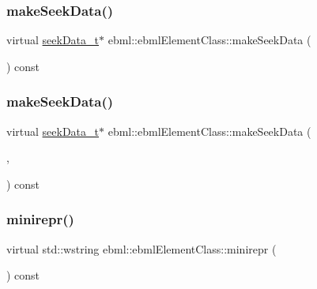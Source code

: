 \subsubsection{\texorpdfstring{make\+Seek\+Data()}{makeSeekData()}\hspace{0.1cm}{\footnotesize\ttfamily [1/2]}}
{\footnotesize\ttfamily virtual \mbox{\hyperlink{classebml_1_1seekData__t}{seek\+Data\+\_\+t}}$\ast$ ebml\+::ebml\+Element\+Class\+::make\+Seek\+Data (\begin{DoxyParamCaption}\item[{const \mbox{\hyperlink{classebml_1_1parseFile}{parse\+File}} \&}]{ }\end{DoxyParamCaption}) const\hspace{0.3cm}{\ttfamily [virtual]}}

\mbox{\label{classebml_1_1ebmlElementClass_ac844edef1226b728c127cdf946b3d152}} 
\subsubsection{\texorpdfstring{make\+Seek\+Data()}{makeSeekData()}\hspace{0.1cm}{\footnotesize\ttfamily [2/2]}}
{\footnotesize\ttfamily virtual \mbox{\hyperlink{classebml_1_1seekData__t}{seek\+Data\+\_\+t}}$\ast$ ebml\+::ebml\+Element\+Class\+::make\+Seek\+Data (\begin{DoxyParamCaption}\item[{const \mbox{\hyperlink{classebml_1_1parseFile}{parse\+File}} \&}]{,  }\item[{const \mbox{\hyperlink{namespaceebml_adad533b7705a16bb360fe56380c5e7be}{ebml\+Element\+\_\+sp}} \&}]{ }\end{DoxyParamCaption}) const\hspace{0.3cm}{\ttfamily [virtual]}}

\mbox{\label{classebml_1_1ebmlElementClass_a251cc751901423a86099d58d49f28291}} 
\subsubsection{\texorpdfstring{minirepr()}{minirepr()}}
{\footnotesize\ttfamily virtual std\+::wstring ebml\+::ebml\+Element\+Class\+::minirepr (\begin{DoxyParamCaption}{ }\end{DoxyParamCaption}) const\hspace{0.3cm}{\ttfamily [virtual]}}

